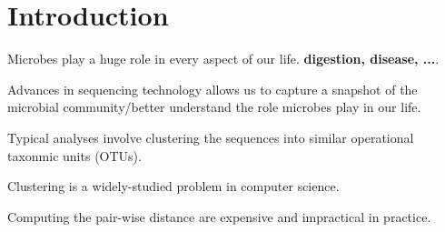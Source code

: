\section{Introduction}

Microbes play a huge role in every aspect of our life. {\bf digestion, disease, ...}.

Advances in sequencing technology allows us to capture a snapshot of the microbial community/better understand the role microbes play in our life.

Typical analyses involve clustering the sequences into similar operational taxonmic units (OTUs).

Clustering is a widely-studied problem in computer science.

Computing the pair-wise distance are expensive and impractical in practice.

